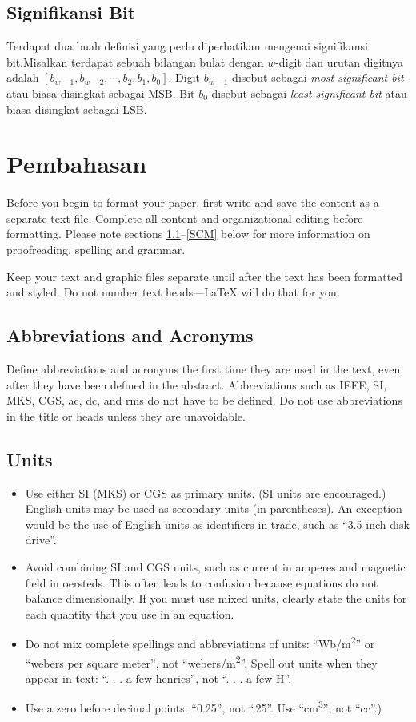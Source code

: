 \documentclass[10pt,conference]{IEEEtran}
\begin{document}
\subsection{Signifikansi Bit}
Terdapat dua buah definisi yang perlu diperhatikan mengenai signifikansi bit.Misalkan terdapat sebuah bilangan bulat dengan $ w $-digit dan urutan digitnya adalah $ [b_{w-1}, b_{w-2}, \cdots, b_{2}, b_{1}, b_{0}] $. Digit $ b_{w-1} $ disebut sebagai \emph{most significant bit} atau biasa disingkat sebagai MSB. Bit $ b_{0} $ disebut sebagai \emph{least significant bit} atau biasa disingkat sebagai LSB.

\section{Pembahasan}
Before you begin to format your paper, first write and save the content as a 
separate text file. Complete all content and organizational editing before 
formatting. Please note sections \ref{AA}--\ref{SCM} below for more information on 
proofreading, spelling and grammar.

Keep your text and graphic files separate until after the text has been 
formatted and styled. Do not number text heads---{\LaTeX} will do that 
for you.

\subsection{Abbreviations and Acronyms}\label{AA}
Define abbreviations and acronyms the first time they are used in the text, 
even after they have been defined in the abstract. Abbreviations such as 
IEEE, SI, MKS, CGS, ac, dc, and rms do not have to be defined. Do not use 
abbreviations in the title or heads unless they are unavoidable.

\subsection{Units}
\begin{itemize}
\item Use either SI (MKS) or CGS as primary units. (SI units are encouraged.) English units may be used as secondary units (in parentheses). An exception would be the use of English units as identifiers in trade, such as ``3.5-inch disk drive''.
\item Avoid combining SI and CGS units, such as current in amperes and magnetic field in oersteds. This often leads to confusion because equations do not balance dimensionally. If you must use mixed units, clearly state the units for each quantity that you use in an equation.
\item Do not mix complete spellings and abbreviations of units: ``Wb/m\textsuperscript{2}'' or ``webers per square meter'', not ``webers/m\textsuperscript{2}''. Spell out units when they appear in text: ``. . . a few henries'', not ``. . . a few H''.
\item Use a zero before decimal points: ``0.25'', not ``.25''. Use ``cm\textsuperscript{3}'', not ``cc''.)
\end{itemize}
\end{document}
